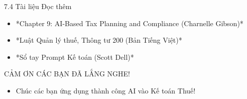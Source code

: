 \documentclass[aspectratio=169]{beamer}
\begin{document}
\begin{frame}{7.4 Tài liệu Đọc thêm}
    \begin{itemize}
        \item *Chapter 9: AI-Based Tax Planning and Compliance (Charnelle Gibson)*
        \item *Luật Quản lý thuế, Thông tư 200 (Bản Tiếng Việt)*
        \item *Sổ tay Prompt Kế toán (Scott Dell)*
    \end{itemize}
\end{frame}


\begin{frame}{CẢM ƠN CÁC BẠN ĐÃ LẮNG NGHE!}
    \begin{itemize}
        \item Chúc các bạn ứng dụng thành công AI vào Kế toán Thuế!
    \end{itemize}
\end{frame}
\end{document}
